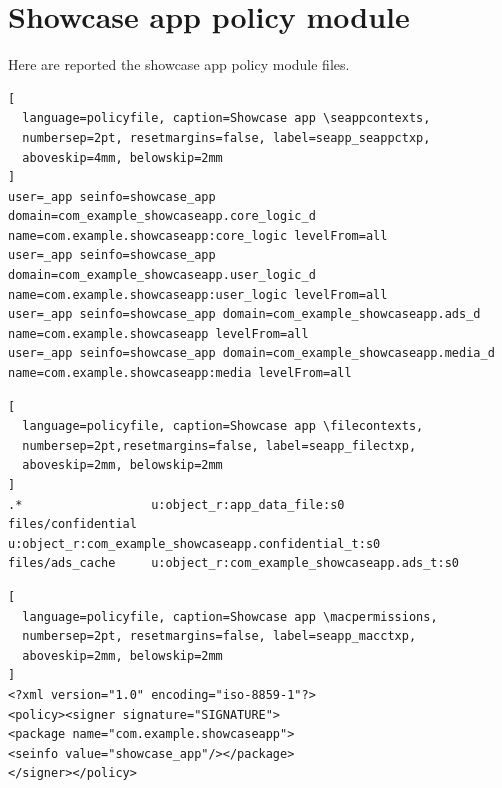 

\newpage


\section[Policy module]{Showcase app policy module}\label{appendix:seapp_policy}

Here are reported the showcase app policy module files.
\begin{lstlisting}[
  language=policyfile, caption=Showcase app \seappcontexts,
  numbersep=2pt, resetmargins=false, label=seapp_seappctxp,
  aboveskip=4mm, belowskip=2mm
]
user=_app seinfo=showcase_app domain=com_example_showcaseapp.core_logic_d name=com.example.showcaseapp:core_logic levelFrom=all
user=_app seinfo=showcase_app domain=com_example_showcaseapp.user_logic_d name=com.example.showcaseapp:user_logic levelFrom=all
user=_app seinfo=showcase_app domain=com_example_showcaseapp.ads_d name=com.example.showcaseapp levelFrom=all
user=_app seinfo=showcase_app domain=com_example_showcaseapp.media_d name=com.example.showcaseapp:media levelFrom=all
\end{lstlisting}
\begin{lstlisting}[
  language=policyfile, caption=Showcase app \filecontexts,
  numbersep=2pt,resetmargins=false, label=seapp_filectxp,
  aboveskip=2mm, belowskip=2mm
]
.*                  u:object_r:app_data_file:s0
files/confidential  u:object_r:com_example_showcaseapp.confidential_t:s0
files/ads_cache     u:object_r:com_example_showcaseapp.ads_t:s0
\end{lstlisting}
\begin{lstlisting}[
  language=policyfile, caption=Showcase app \macpermissions,
  numbersep=2pt, resetmargins=false, label=seapp_macctxp,
  aboveskip=2mm, belowskip=2mm
]
<?xml version="1.0" encoding="iso-8859-1"?>
<policy><signer signature="SIGNATURE">
<package name="com.example.showcaseapp">
<seinfo value="showcase_app"/></package>
</signer></policy>
\end{lstlisting}
\newpage
